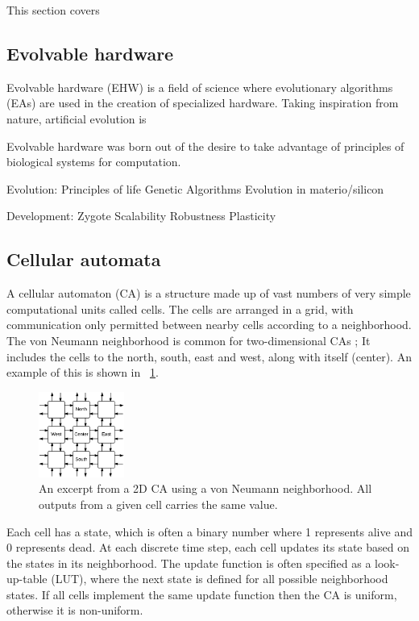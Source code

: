 This section covers \TODO

\subsection{Evolvable hardware}

Evolvable hardware (EHW) is a field of science where evolutionary algorithms (EAs) are used in the creation of specialized hardware.
Taking inspiration from nature, artificial evolution is 

Evolvable hardware was born out of the desire to take advantage of principles of biological systems for computation.


Evolution:
Principles of life
Genetic Algorithms
Evolution in materio/silicon \cite{miller2014evolution}

Development:
\cite{harding2008artificial} \cite{tufte2008evodevo}
Zygote
Scalability
Robustness
Plasticity

\subsection{Cellular automata}


A cellular automaton (CA) is a structure made up of vast numbers of very simple computational units called cells.
The cells are arranged in a grid, with communication only permitted between nearby cells according to a neighborhood.
The von Neumann neighborhood is common for two-dimensional CAs \CN;
It includes the cells to the north, south, east and west, along with itself (center).
An example of this is shown in \figurename~\ref{fig:ca}.

\begin{figure}[!ht]
    \centering
    \includegraphics[width=0.25\textwidth]{figures/ca}
    \caption{An excerpt from a 2D CA using a von Neumann neighborhood. All outputs from a given cell carries the same value.}
    \label{fig:ca}
\end{figure}

Each cell has a state, which is often a binary number where 1 represents alive and 0 represents dead.
At each discrete time step, each cell updates its state based on the states in its neighborhood.
The update function is often specified as a look-up-table (LUT), where the next state is defined for all possible neighborhood states\footnotemark.
If all cells implement the same update function then the CA is uniform, otherwise it is non-uniform.

